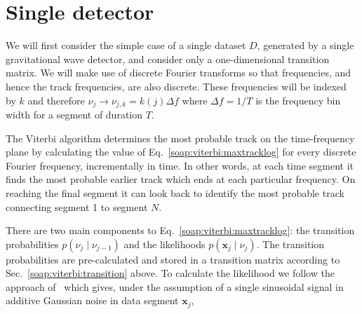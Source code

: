 \section{\label{soap:single}Single detector}
%
%
We will first consider the simple case of a single dataset $D$, generated by a single gravitational wave detector, and consider only a one-dimensional transition matrix. We will make use of discrete Fourier transforms so that frequencies, and hence the track frequencies, are also discrete. These frequencies will be indexed by $k$ and therefore $\nu_j \rightarrow \nu_{j,k}=k(j)\Delta f$ where $\Delta f=1/T$ is the frequency bin width for a segment of duration $T$.

 The Viterbi algorithm determines the most probable track on the time-frequency plane by calculating the value of Eq.~\ref{soap:viterbi:maxtracklog} for every discrete Fourier frequency, incrementally in time. In other words, at each time segment it finds the most probable earlier track which ends at each particular frequency. On reaching the final segment it can look back to identify the most probable track connecting segment 1 to segment $N$.

There are two main components to Eq.~\ref{soap:viterbi:maxtracklog}: the transition probabilities $p(\nu_j \mid \nu_{j-1})$ and the likelihoods $p({\bm x_j} \mid \nu_j)$. The transition probabilities are pre-calculated and stored in a transition matrix according to Sec.~\ref{soap:viterbi:transition} above. To calculate the likelihood we follow the approach of~\citep{bretthorst1988BayesianSpectruma} which gives, under the assumption of a single sinusoidal signal in additive Gaussian noise in data segment ${\bm x_j}$, 

